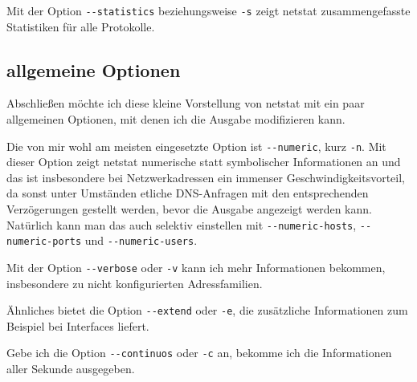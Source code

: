\begin{normaltext}
  Mit der Option \verb?--statistics? beziehungsweise \verb?-s? zeigt netstat
  zusammengefasste Statistiken für alle Protokolle.

  \subsection{allgemeine Optionen}
  \label{sec:netz-werkzeuge-netstat-allgemein}

  Abschließen möchte ich diese kleine Vorstellung von netstat mit ein paar
  allgemeinen Optionen, mit denen ich die Ausgabe modifizieren kann.

  Die von mir wohl am meisten eingesetzte Option ist \verb?--numeric?, kurz
  \verb?-n?. Mit dieser Option zeigt netstat numerische statt symbolischer
  Informationen an und das ist insbesondere bei Netzwerkadressen ein immenser
  Geschwindigkeitsvorteil, da sonst unter Umständen etliche DNS-Anfragen mit
  den entsprechenden Verzögerungen gestellt werden, bevor die Ausgabe
  angezeigt werden kann. Natürlich kann man das auch selektiv einstellen mit
  \verb?--numeric-hosts?, \verb?--numeric-ports? und \verb?--numeric-users?.

  Mit der Option \verb?--verbose? oder \verb?-v? kann ich mehr Informationen
  bekommen, insbesondere zu nicht konfigurierten Adressfamilien.

  Ähnliches bietet die Option \verb?--extend? oder \verb?-e?, die zusätzliche
  Informationen zum Beispiel bei Interfaces liefert.

  Gebe ich die Option \verb?--continuos? oder \verb?-c? an, bekomme ich die
  Informationen aller Sekunde ausgegeben.
\end{normaltext}





